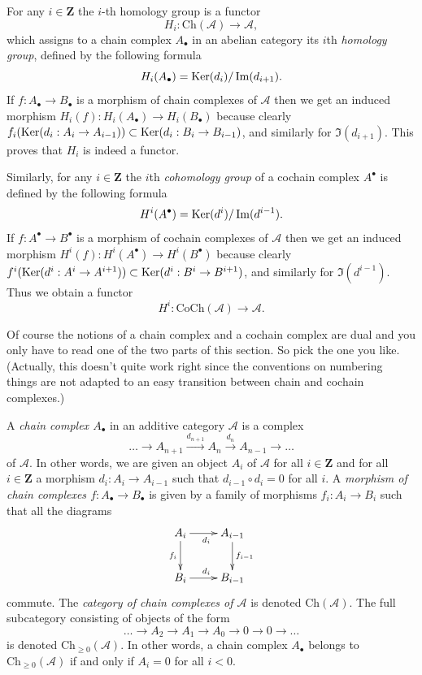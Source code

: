 For any $i \in \mathbf{Z}$ the $i$-th
homology group is a functor
$$
H_i : \text{Ch}(\mathcal{A}) \longrightarrow
\mathcal{A},
$$
which assigns to a chain complex $A_\bullet$
in an abelian category
its  $i$th {\it homology group}, defined by
the following formula
$$
H_i(A_\bullet) = \mathop{\mathrm{Ker}}(d_i)/\mathop{\mathrm{Im}}(d_{i + 1}).
$$
If $f : A_\bullet \to B_\bullet$ is a
morphism of chain
complexes of $\mathcal{A}$ then we get an
induced
morphism $H_i(f) : H_i(A_\bullet) \to
H_i(B_\bullet)$
because clearly
$f_i(\mathop{\mathrm{Ker}}(d_i : A_i \to A_{i - 1})) \subset
\mathop{\mathrm{Ker}}(d_i : B_i \to B_{i - 1})$, and similarly
for $\Im(d_{i + 1})$.
This proves that $H_i$ is indeed a functor.

Similarly,
for any $i \in \mathbf{Z}$ the $i$th {\it
cohomology group}
of a cochain complex $A^\bullet$ is defined
by
the following formula
$$
H^i(A^\bullet) = \mathop{\mathrm{Ker}}(d^i)/\mathop{\mathrm{Im}}(d^{i - 1}).
$$
If $f : A^\bullet \to B^\bullet$ is a
morphism of cochain
complexes of $\mathcal{A}$ then we get an
induced
morphism $H^i(f) : H^i(A^\bullet) \to
H^i(B^\bullet)$
because clearly
$f^i(\mathop{\mathrm{Ker}}(d^i : A^i \to A^{i + 1})) \subset
\mathop{\mathrm{Ker}}(d^i : B^i \to B^{i + 1})$, and similarly
for $\Im(d^{i - 1})$.
Thus we obtain a functor
$$
H^i : \text{CoCh}(\mathcal{A})
\longrightarrow \mathcal{A}.
$$




\medskip\noindent
Of course the notions of a chain complex and
a cochain complex
are dual and you only have to read one of the
two parts of
this section. So pick the one you like.
(Actually, this doesn't
quite work right since the conventions on
numbering things
are not adapted to an easy transition between
chain and cochain
complexes.)

\medskip\noindent
A {\it chain complex $A_\bullet$} in an
additive category $\mathcal{A}$
is a complex
$$
\ldots \to
A_{n + 1} \xrightarrow{d_{n + 1}}
A_n \xrightarrow{d_n}
A_{n - 1} \to
\ldots
$$
of $\mathcal{A}$. In other words, we are
given an object $A_i$ of
$\mathcal{A}$ for all $i \in \mathbf{Z}$ and
for
all $i \in \mathbf{Z}$ a morphism $d_i : A_i
\to A_{i - 1}$ such that
$d_{i - 1} \circ d_i = 0$ for all $i$. A {\it
morphism of chain
complexes $f : A_\bullet \to B_\bullet$} is
given by a
family of morphisms $f_i : A_i \to B_i$ such
that all
the diagrams
$$
\xymatrix{
A_i \ar[r]_{d_i} \ar[d]_{f_i} & A_{i - 1}
\ar[d]^{f_{i - 1}} \\
B_i \ar[r]^{d_i} & B_{i - 1}
}
$$
commute. The {\it category of chain complexes
of $\mathcal{A}$}
is denoted $\text{Ch}(\mathcal{A})$. The full
subcategory consisting
of objects of the form
$$
\ldots \to A_2 \to A_1 \to A_0 \to 0 \to 0
\to \ldots
$$
is denoted $\text{Ch}_{\geq 0}(\mathcal{A})$.
In other words, a chain complex $A_\bullet$
belongs to
$\text{Ch}_{\geq 0}(\mathcal{A})$ if and only
if
$A_i = 0$ for all $i < 0$.

